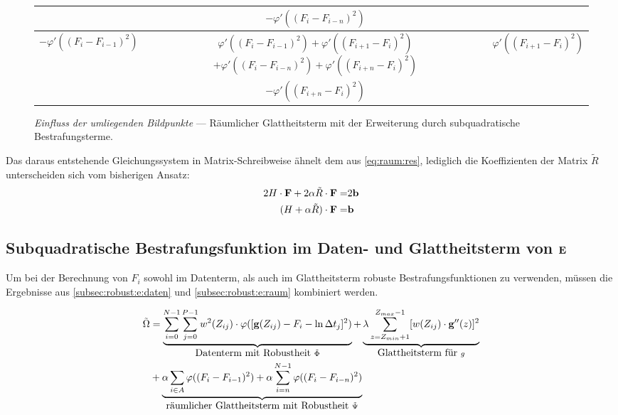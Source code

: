 \begin{figure}[H]
  \begin{center}
    \begin{tabular}{c|c|c}
        \cline{2-2}
        & $-\varphi'((F_i - F_{i-n})^2)$ & \\
        \hline
            \multicolumn{1}{|c|}{$-\varphi'((F_i - F_{i-1})^2)$}
            & \shortstack{$\varphi'((F_i - F_{i-1})^2) + \varphi'((F_{i+1} - F_{i})^2) $ \\
              $ +\varphi'((F_i - F_{i-n})^2) + \varphi'((F_{i+n} - F_{i})^2)$} & 
            \multicolumn{1}{c|}{$\varphi'((F_{i+1} - F_{i})^2)$}\\
        \hline
        & $-\varphi'((F_{i+n} - F_{i})^2)$ & \\
        \cline{2-2} 
    \end{tabular}
  \end{center}
\caption{\textit{Einfluss der umliegenden Bildpunkte} --- Räumlicher Glattheitsterm mit der Erweiterung durch subquadratische Bestrafungsterme.}
\label{fig:robust:raum:stencil}
\end{figure}

Das daraus entstehende Gleichungssystem in Matrix-Schreibweise ähnelt dem aus \autoref{eq:raum:res}, lediglich die Koeffizienten der Matrix $\tilde R$ unterscheiden sich vom bisherigen Ansatz:
\begin{align}
\label{eq:robust:raum:lgs}
2 H \cdot \mathbf F + 2 \alpha \tilde R\cdot \mathbf F =& 2 \mathbf b \\
(H+\alpha \tilde R)\cdot \mathbf F =& \mathbf b
\end{align}






\subsection{Subquadratische Bestrafungsfunktion im Daten- und Glattheitsterm von $\mathbf E$ }
Um bei der Berechnung von $F_i$ sowohl im Datenterm, als auch im Glattheitsterm robuste Bestrafungsfunktionen zu verwenden, müssen die Ergebnisse aus \autoref{subsec:robust:e:daten} und \autoref{subsec:robust:e:raum} kombiniert werden.


\begin{align}
\tilde{\Omega} &= 
    \underbrace{\sum_{i=0}^{N-1} \sum_{j=0}^{P-1} w^2(Z_{ij})
    \cdot \varphi([\mathbf g(Z_{ij}) - F_i - \ln \Delta t_j]^2)}_{\mbox{Datenterm mit Robustheit }\tilde{\Phi}}
    + \underbrace{\lambda  \sum_{z=Z_{min}+1}^{Z_{max}-1} [w(Z_{ij}) \cdot \mathbf g''(z)]^2}_{\mbox{Glattheitsterm für }g} \nonumber\\
    & + \underbrace{
        \alpha \sum_{i\in A}
            \varphi((F_i - F_{i-1})^2)
        +\alpha \sum_{i=n}^{N-1}\varphi((F_i - F_{i-n})^2)
    }_{\mbox{räumlicher Glattheitsterm mit Robustheit }\Tilde \Psi}
\end{align}


